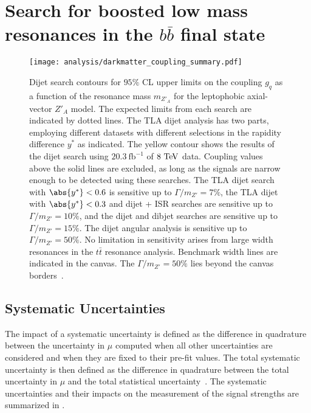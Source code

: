 \chapter{Search for boosted low mass resonances in the $b\bar{b}$ final state}\label{chapter:analysis}

\begin{figure}[htbp]
 \centering
 \texttt{[image: analysis/darkmatter\_coupling\_summary.pdf]}
 \caption[Dijet search contours for $95\%$ CL upper limits on the coupling $g_{q}$ for the leptophobic axial-vector $Z'_{A}$ model.]{%
 Dijet search contours for $95\%$ CL upper limits on the coupling $g_{q}$ as a function of the resonance mass $m_{Z'_{A}}$ for the leptophobic axial-vector $Z'_{A}$ model.
 The expected limits from each search are indicated by dotted lines.
 The TLA dijet analysis has two parts, employing different datasets with different selections in the rapidity difference $y^{*}$ as indicated.
 The yellow contour shows the results of the dijet search using $20.3~\mathrm{fb}^{-1}$ of $8~\mathrm{TeV}$ data.
 Coupling values above the solid lines are excluded, as long as the signals are narrow enough to be detected using these searches.
 The TLA dijet search with $\abs{y^{*}} < 0.6$ is sensitive up to $\Gamma/m_{Z'} = 7\%$, the TLA dijet with $\abs{y^{*}} < 0.3$ and dijet + ISR searches are sensitive up to $\Gamma/m_{Z'} = 10\%$, and the dijet and dibjet searches are sensitive up to $\Gamma/m_{Z'} = 15\%$.
 The dijet angular analysis is sensitive up to $\Gamma/m_{Z'} = 50\%$.
 No limitation in sensitivity arises from large width resonances in the $t\bar{t}$ resonance analysis.
 Benchmark width lines are indicated in the canvas.
 The $\Gamma/m_{Z'} = 50\%$ lies beyond the canvas borders~\cite{EXOT-2017-32}.}
 \label{fig:darkmatter_coupling_summary}
\end{figure}

\section{Systematic Uncertainties}\label{sec:systematic_uncertainties}

The impact of a systematic uncertainty is defined as the difference in quadrature between the uncertainty in $\mu$ computed when all other uncertainties are considered and when they are fixed to their pre-fit values.
The total systematic uncertainty is then defined as the difference in quadrature between the total uncertainty in $\mu$ and the total statistical uncertainty~\cite{ATLAS-CONF-2018-052}.
The systematic uncertainties and their impacts on the measurement of the signal strengths are summarized in .

